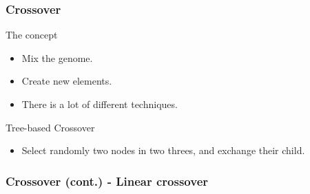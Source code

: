 \begin{frame}
  \frametitle{Crossover}
  \begin{block}{The concept}
    \begin{itemize}
    \item Mix the genome.
    \item Create new elements.
    \item There is a lot of different techniques.
    \end{itemize}
  \end{block}

  \begin{block}{Tree-based Crossover}
    \begin{itemize}
    \item Select randomly two nodes in two threes, and exchange their
      child.
    \end{itemize}
  \end{block}
\end{frame}


\begin{frame}
  \frametitle{Crossover (cont.) - Linear crossover}
  \begin{figure}[ht]
    \centering
  \end{figure}
\end{frame}


